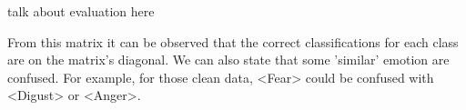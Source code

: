 talk about evaluation here




From this matrix it can be observed that the correct classifications for each class are on the matrix’s diagonal.
We can also state that some 'similar' emotion are confused. 
For example, for those clean data, <Fear> could be confused with <Digust> or <Anger>.












